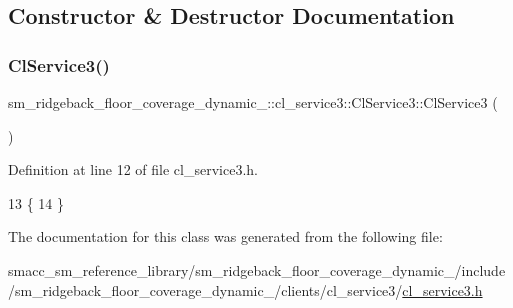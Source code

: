 \subsection{Constructor \& Destructor Documentation}
\mbox{\label{classsm__ridgeback__floor__coverage__dynamic__1_1_1cl__service3_1_1ClService3_ad1bdb8b4990a86c3dd1a55353c56cc2d}} 
\subsubsection{\texorpdfstring{Cl\+Service3()}{ClService3()}}
{\footnotesize\ttfamily sm\+\_\+ridgeback\+\_\+floor\+\_\+coverage\+\_\+dynamic\+\_\+::cl\+\_\+service3\+::\+Cl\+Service3\+::\+Cl\+Service3 (\begin{DoxyParamCaption}{ }\end{DoxyParamCaption})\hspace{0.3cm}{\ttfamily [inline]}}



Definition at line 12 of file cl\+\_\+service3.\+h.


\begin{DoxyCode}
13   \{
14   \}
\end{DoxyCode}


The documentation for this class was generated from the following file\+:\begin{DoxyCompactItemize}
\item 
smacc\+\_\+sm\+\_\+reference\+\_\+library/sm\+\_\+ridgeback\+\_\+floor\+\_\+coverage\+\_\+dynamic\+\_/include/sm\+\_\+ridgeback\+\_\+floor\+\_\+coverage\+\_\+dynamic\+\_/clients/cl\+\_\+service3/\hyperlink{sm__ridgeback__floor__coverage__dynamic__1_2include_2sm__ridgeback__floor__coverage__dynamic__1_be88e234d88bf1877ca840c01df6e1c2}{cl\+\_\+service3.\+h}\end{DoxyCompactItemize}
